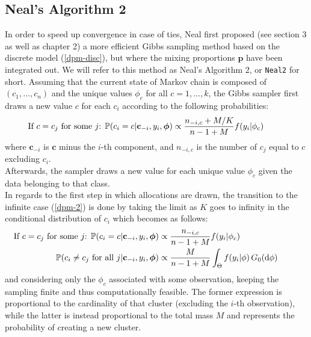 \subsection{Neal's Algorithm 2} \label{neal2}
In order to speed up convergence in case of ties, Neal first proposed (see \cite{neal} section 3 as well as \cite{book} chapter 2) a more efficient Gibbs sampling method based on the discrete model (\ref{dpm-disc}), but where the mixing proportions $\textbf{p}$ have been integrated out.
We will refer to this method as Neal's Algorithm 2, or \verb|Neal2| for short.
Assuming that the current state of Markov chain is composed of $(c_1,\dots,c_n)$  and the unique values $\phi_c$ for all $c=1,\dots,k$, the Gibbs sampler first draws a new value $c$ for each $c_i$ according to the following probabilities:
\begin{align}
	\hspace{-25pt}
	\vspace{-12pt}
	\text{If $c=c_j$ for some $j$: }
	\PP(c_{i}=c | \mathbf c_{-i}, y_{i},\boldsymbol\phi) \propto \frac{n_{-i,c} + M/{K}}{n-1+M} f(y_{i}|\phi_{c}) 
\end{align}
where $\mathbf c_{-i}$ is $\mathbf c$ minus the $i$-th component, and $n_{-i,c}$ is the number of $c_j$ equal to $c$ excluding $c_i$. \\
Afterwards, the sampler draws a new value for each unique value $\phi_c$ given the data belonging to that class. \\ %
In regards to the first step in which allocations are drawn, the transition to the infinite case (\ref{dpm-2}) is done by taking the limit as $K$ goes to infinity in the conditional distribution of $c_i$ which becomes as follows:
\begin{equation}
	\begin{aligned} \label{probasneal2}
	\hspace{-25pt}
	\vspace{-12pt}
	\text{If $c=c_j$ for some $j$: }
	\PP(c_{i}=c | \mathbf c_{-i}, y_{i},\boldsymbol\phi) &\propto \frac{n_{-i,c} }{n-1+M} f(y_{i}|\phi_{c}) \\
	\PP(c_{i}\neq c_{j} \text{ for all } j | \mathbf c_{-i}, y_{i},\boldsymbol\phi) &\propto \frac{M }{n-1+M} \int_{\Theta} f(y_{i}|\phi) \, G_0(\de\phi) 
	\end{aligned}
\end{equation}
and considering only the $\phi_c$ associated with some observation, keeping the sampling finite and thus computationally feasible.
The former expression is proportional to the cardinality of that cluster (excluding the $i$-th observation), while the latter is instead proportional to the total mass $M$ and represents the probability of creating a new cluster. \\
